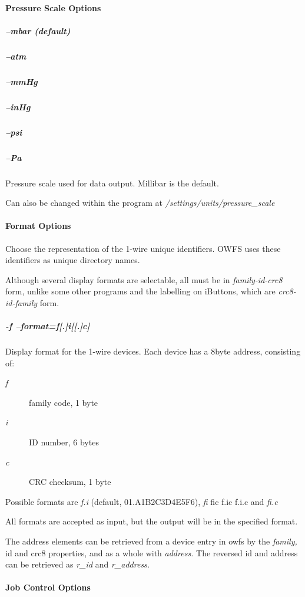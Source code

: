 \paragraph*{Pressure Scale Options}

\subparagraph*{--mbar (default)}
\subparagraph*{--atm}
\subparagraph*{--mmHg}
\subparagraph*{--inHg}
\subparagraph*{--psi}
\subparagraph*{--Pa}Pressure
scale used for data output. Millibar is the default. 

Can also be changed
within the program at \textit{/settings/units/pressure\_scale}             
\paragraph*{Format
Options}
Choose the representation of the 1-wire unique identifiers. OWFS uses
these identifiers as unique directory names. 

Although several display formats
are selectable, all must be in  \textit{family-id-crc8} form, unlike some other programs
and the labelling on iButtons, which are \textit{crc8-id-family} form. 
\subparagraph*{-f --format=\dq{}f[.]i[[.]c]\dq{}}Display
format for the 1-wire devices. Each device has a 8byte address, consisting
of: \begin{description}
\item [\textit{f} ] family code, 1 byte 
\item [\textit{i} ] ID number, 6 bytes 
\item [\textit{c} ] CRC checksum, 1 byte 
\end{description}


Possible
formats are \textit{f.i} (default, 01.A1B2C3D4E5F6), \textit{fi} fic f.ic f.i.c and \textit{fi.c} 

All formats
are accepted as input, but the output will be in the specified format. 

The
address elements can be retrieved from a device entry in owfs by the  \textit{family,}
id and crc8 properties, and as a whole with \textit{address.} The reversed id and
address can be retrieved as \textit{r\_id} and  \textit{r\_address.}            
\paragraph*{Job Control
Options}

